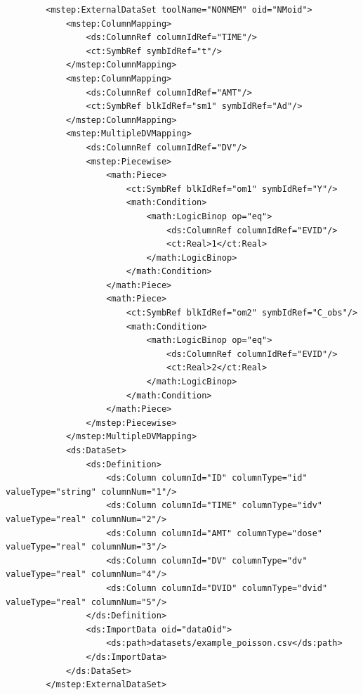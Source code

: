 \lstset{language=XML}
\begin{lstlisting}
        <mstep:ExternalDataSet toolName="NONMEM" oid="NMoid">
            <mstep:ColumnMapping>
                <ds:ColumnRef columnIdRef="TIME"/>
                <ct:SymbRef symbIdRef="t"/>
            </mstep:ColumnMapping>
            <mstep:ColumnMapping>
                <ds:ColumnRef columnIdRef="AMT"/>
                <ct:SymbRef blkIdRef="sm1" symbIdRef="Ad"/>
            </mstep:ColumnMapping>
            <mstep:MultipleDVMapping>
                <ds:ColumnRef columnIdRef="DV"/>
                <mstep:Piecewise>
                    <math:Piece>
                        <ct:SymbRef blkIdRef="om1" symbIdRef="Y"/>
                        <math:Condition>
                            <math:LogicBinop op="eq">
                                <ds:ColumnRef columnIdRef="EVID"/>
                                <ct:Real>1</ct:Real>
                            </math:LogicBinop>
                        </math:Condition>
                    </math:Piece>
                    <math:Piece>
                        <ct:SymbRef blkIdRef="om2" symbIdRef="C_obs"/>
                        <math:Condition>
                            <math:LogicBinop op="eq">
                                <ds:ColumnRef columnIdRef="EVID"/>
                                <ct:Real>2</ct:Real>
                            </math:LogicBinop>
                        </math:Condition>
                    </math:Piece>
                </mstep:Piecewise>
            </mstep:MultipleDVMapping>
            <ds:DataSet>
                <ds:Definition>
                    <ds:Column columnId="ID" columnType="id" valueType="string" columnNum="1"/>
                    <ds:Column columnId="TIME" columnType="idv" valueType="real" columnNum="2"/>
                    <ds:Column columnId="AMT" columnType="dose" valueType="real" columnNum="3"/>
                    <ds:Column columnId="DV" columnType="dv" valueType="real" columnNum="4"/>
                    <ds:Column columnId="DVID" columnType="dvid" valueType="real" columnNum="5"/>
                </ds:Definition>
                <ds:ImportData oid="dataOid">
                    <ds:path>datasets/example_poisson.csv</ds:path>
                </ds:ImportData>
            </ds:DataSet>
        </mstep:ExternalDataSet>
\end{lstlisting}












